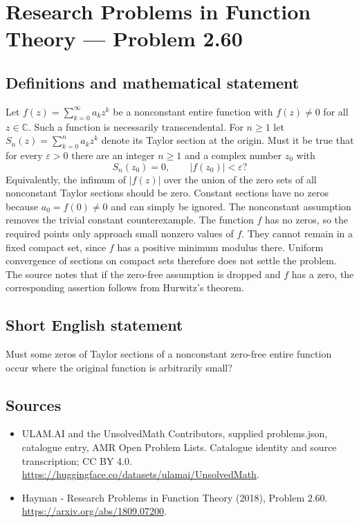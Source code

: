 \documentclass[11pt,a4paper]{article}
\begin{document}
\section*{Research Problems in Function Theory — Problem 2.60}\label{statement}

\subsection{Definitions and mathematical statement}
Let $f(z)=\sum_{k=0}^{\infty}a_kz^k$ be a nonconstant entire function with $f(z)\ne0$ for all $z\in\mathbb C$. Such a function is necessarily transcendental. For $n\ge1$ let
$S_n(z)=\sum_{k=0}^na_kz^k$ denote its Taylor section at the origin.
Must it be true that for every $\varepsilon>0$ there are an integer $n\ge1$ and a complex number $z_0$ with
\[
S_n(z_0)=0,\qquad |f(z_0)|<\varepsilon?
\]
Equivalently, the infimum of $|f(z)|$ over the union of the zero sets of all nonconstant Taylor sections should be zero. Constant sections have no zeros because $a_0=f(0)\ne0$ and can simply be ignored.
The nonconstant assumption removes the trivial constant counterexample. The function $f$ has no zeros, so the required points only approach small nonzero values of $f$. They cannot remain in a fixed compact set, since $f$ has a positive minimum modulus there. Uniform convergence of sections on compact sets therefore does not settle the problem. The source notes that if the zero-free assumption is dropped and $f$ has a zero, the corresponding assertion follows from Hurwitz's theorem.
\subsection{Short English statement}
Must some zeros of Taylor sections of a nonconstant zero-free entire function occur where the original function is arbitrarily small?
\subsection{Sources}
\begin{itemize}
\item[S1] ULAM.AI and the UnsolvedMath Contributors, supplied problems.json, catalogue entry, AMR Open Problem Lists. Catalogue identity and source transcription; CC BY 4.0.
\url{https://huggingface.co/datasets/ulamai/UnsolvedMath}.
\item[S2] Hayman - Research Problems in Function Theory (2018), Problem 2.60. 
\url{https://arxiv.org/abs/1809.07200}.
\end{itemize}
\end{document}
